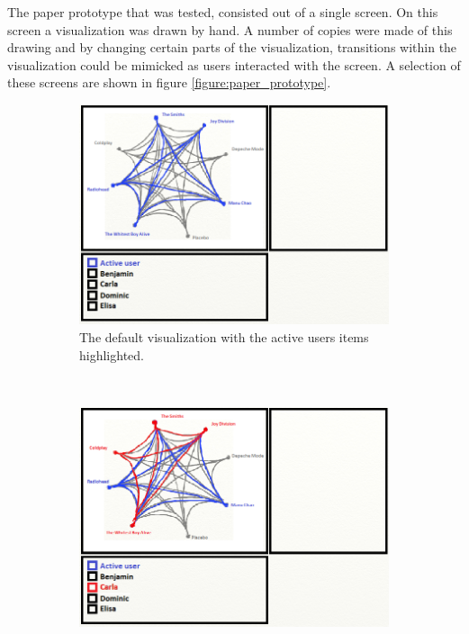 The paper prototype that was tested, consisted out of a single screen. On this screen a visualization was drawn by hand. A number of copies were made of this drawing and by changing certain parts of the visualization, transitions within the visualization could be mimicked as users interacted with the screen. A selection of these screens are shown in figure \ref{figure:paper_prototype}.

\begin{figure}
	\centering
	\begin{subfigure}[t]{0.3\textwidth}
					\centering
					\includegraphics[width=\textwidth]{img/paper_prototype_default}
					\caption{The default visualization with the active users items highlighted.}
					\label{figure:paper_prototype_default}
	\end{subfigure}%
	~
	\begin{subfigure}[t]{0.3\textwidth}
					\centering
					\includegraphics[width=\textwidth]{img/paper_prototype_user_click}

\end{subfigure}
\end{figure}
